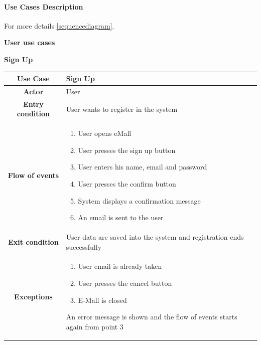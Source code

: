 \documentclass[table, 12pt]{article} %
\begin{document}
    \paragraph{Use Cases Description}

    For more details \ref{sequencediagram}.

        \begin{itemize}
            \item \textbf {User use cases}

            \begin{table}[H]
                \item[] \textbf{Sign Up}
                \item[]
                \centering
                \begin{tabular}{|c |m{}|}
                    \hline
                    \textbf{Use Case} & Sign Up\\ \hline
                    \textbf{Actor} & User\\ \hline
                    \textbf{Entry condition} & User wants to register in the system\\  \hline
                    \textbf{Flow of events} & \begin{enumerate}
                                                \item User opens eMall
                                                \item User presses the sign up button
                                                \item User enters his name, email and password
                                                \item User presses the confirm button
                                                \item System displays a confirmation message
                                                \item An email is sent to the user

                                            \end{enumerate}\\ \hline
                    \textbf{Exit condition} & User data are saved into the system and registration ends successfully  \\ \hline
                    \textbf{Exceptions} &  \begin{enumerate}
                        \item User email is already taken
                        \item User presses the cancel button
                        \item E-Mall is closed
                    \end{enumerate}
                    An error message is shown and the flow of events starts again from point 3\\ \hline
                \end{tabular}
            \end{table}



\end{itemize}
\end{document}
